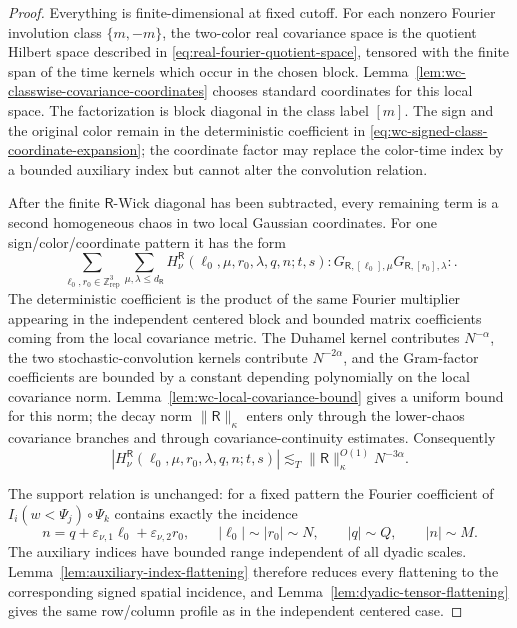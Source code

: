 \documentclass[10pt]{amsart}
\numberwithin{equation}{section}
\theoremstyle{plain}
\theoremstyle{definition}
\theoremstyle{remark}
\begin{document}
\begin{proof}
Everything is finite-dimensional at fixed cutoff.  For each nonzero Fourier involution class $\{m,-m\}$, the two-color real covariance space is the quotient Hilbert space described in \eqref{eq:real-fourier-quotient-space}, tensored with the finite span of the time kernels which occur in the chosen block.  Lemma~\ref{lem:wc-classwise-covariance-coordinates} chooses standard coordinates for this local space.  The factorization is block diagonal in the class label $[m]$.  The sign and the original color remain in the deterministic coefficient in \eqref{eq:wc-signed-class-coordinate-expansion}; the coordinate factor may replace the color-time index by a bounded auxiliary index but cannot alter the convolution relation.

After the finite $\mathsf R$-Wick diagonal has been subtracted, every remaining term is a second homogeneous chaos in two local Gaussian coordinates.  For one sign/color/coordinate pattern it has the form
\[
        \sum_{\ell_0,r_0\in\mathbb Z^3_{\mathrm{rep}}}
        \sum_{\mu,\lambda\le d_{\mathsf R}}
        H_{\nu}^{\mathsf R}(\ell_0,\mu,r_0,\lambda,q,n;t,s)
        :G_{\mathsf R,[\ell_0],\mu}G_{\mathsf R,[r_0],\lambda}: .
\]
The deterministic coefficient is the product of the same Fourier multiplier appearing in the independent centered block and bounded matrix coefficients coming from the local covariance metric.  The Duhamel kernel contributes $N^{-\alpha}$, the two stochastic-convolution kernels contribute $N^{-2\alpha}$, and the Gram-factor coefficients are bounded by a constant depending polynomially on the local covariance norm.  Lemma~\ref{lem:wc-local-covariance-bound} gives a uniform bound for this norm; the decay norm $\|\mathsf R\|_\kappa$ enters only through the lower-chaos covariance branches and through covariance-continuity estimates.  Consequently
\[
        |H_{\nu}^{\mathsf R}(\ell_0,\mu,r_0,\lambda,q,n;t,s)|
        \lesssim_T \|\mathsf R\|_\kappa^{O(1)}N^{-3\alpha}.
\]

The support relation is unchanged: for a fixed pattern the Fourier coefficient of $I_i(w<\Psi_j)\circ\Psi_k$ contains exactly the incidence
\[
        n=q+\varepsilon_{\nu,1}\ell_0
            +\varepsilon_{\nu,2}r_0,
        \qquad |\ell_0|\sim |r_0|\sim N,
        \qquad |q|\sim Q,
        \qquad |n|\sim M.
\]
The auxiliary indices have bounded range independent of all dyadic scales.  Lemma~\ref{lem:auxiliary-index-flattening} therefore reduces every flattening to the corresponding signed spatial incidence, and Lemma~\ref{lem:dyadic-tensor-flattening} gives the same row/column profile as in the independent centered case.
\end{proof}
\end{document}
